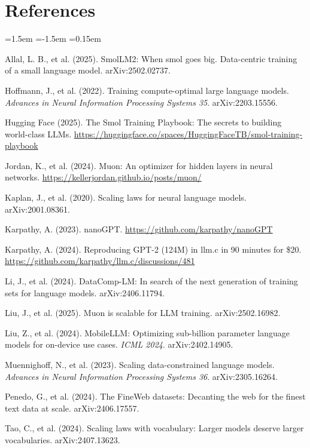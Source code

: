 \documentclass[11pt,a4paper]{article}
\begin{document}
\section*{References}
{\small\raggedright
\begin{list}{}{\leftmargin=1.5em \itemindent=-1.5em \itemsep=0.15em \parsep=0pt}
\item Allal, L. B., et al. (2025). SmolLM2: When smol goes big. Data-centric training of a small language model. arXiv:2502.02737.
\item Hoffmann, J., et al. (2022). Training compute-optimal large language models. \emph{Advances in Neural Information Processing Systems 35}. arXiv:2203.15556.
\item Hugging Face (2025). The Smol Training Playbook: The secrets to building world-class LLMs. \url{https://huggingface.co/spaces/HuggingFaceTB/smol-training-playbook}
\item Jordan, K., et al. (2024). Muon: An optimizer for hidden layers in neural networks. \url{https://kellerjordan.github.io/posts/muon/}
\item Kaplan, J., et al. (2020). Scaling laws for neural language models. arXiv:2001.08361.
\item Karpathy, A. (2023). nanoGPT. \url{https://github.com/karpathy/nanoGPT}
\item Karpathy, A. (2024). Reproducing GPT-2 (124M) in llm.c in 90 minutes for \$20. \url{https://github.com/karpathy/llm.c/discussions/481}
\item Li, J., et al. (2024). DataComp-LM: In search of the next generation of training sets for language models. arXiv:2406.11794.
\item Liu, J., et al. (2025). Muon is scalable for LLM training. arXiv:2502.16982.
\item Liu, Z., et al. (2024). MobileLLM: Optimizing sub-billion parameter language models for on-device use cases. \emph{ICML 2024}. arXiv:2402.14905.
\item Muennighoff, N., et al. (2023). Scaling data-constrained language models. \emph{Advances in Neural Information Processing Systems 36}. arXiv:2305.16264.
\item Penedo, G., et al. (2024). The FineWeb datasets: Decanting the web for the finest text data at scale. arXiv:2406.17557.
\item Tao, C., et al. (2024). Scaling laws with vocabulary: Larger models deserve larger vocabularies. arXiv:2407.13623.
\end{list}
}
\end{document}
